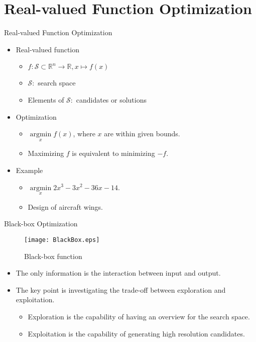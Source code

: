 

\section{Real-valued Function Optimization}

\begin{frame}{Real-valued Function Optimization}
  \begin{itemize}
    \item{Real-valued function}
      \begin{itemize}
        \item $f \colon \mathcal{S} \subset \mathbb{R}^n \to
          \mathbb{R},x \mapsto f(x)$
        \item $\mathcal{S} \colon $ search space
        \item Elements of $\mathcal{S} \colon $ candidates or solutions
      \end{itemize}
    \item{Optimization}
      \begin{itemize}
        \item $\mathop{\arg\min}\limits_{x} f(x)$, where $x$ are within given bounds.
        \item Maximizing $f$ is equivalent to minimizing $-f$.
      \end{itemize}
    \item Example
      \begin{itemize}
        \item $\mathop{\arg\min}\limits_x 2x^3-3x^2-36x-14$.
        \item Design of aircraft wings.
      \end{itemize}
  \end{itemize}
\end{frame}

\begin{frame}{Black-box Optimization}

  \begin{figure}[h]
    \texttt{[image: BlackBox.eps]}
    \caption{Black-box function}  
  \end{figure}
  \begin{itemize}
    \item The only information is the interaction between input and
    output.  
  \item The key point is investigating the trade-off between
    \alert{exploration}
    and \alert{exploitation}.
    \begin{itemize}
      \item Exploration is the capability of \alert{having an overview for the search
        space}.
  \item Exploitation is the capability of \alert{generating high resolution
    candidates}. 
    \end{itemize}
  \end{itemize}

\end{frame}

